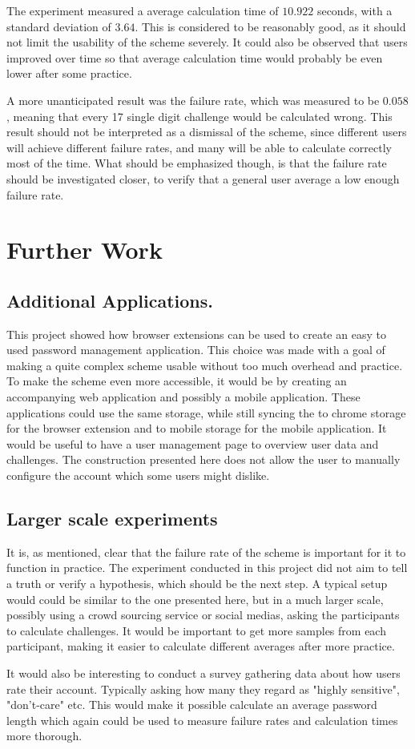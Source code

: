 \par The experiment measured a average calculation time of $10.922$ seconds, with a standard deviation of $3.64$. This is considered to be reasonably good, as it should not limit the usability of the scheme severely. It could also be observed that users improved over time so that average calculation time would probably be even lower after some practice. 
\par A more unanticipated result was the failure rate, which was measured to be $0.058$, meaning that every 17 single digit challenge would be calculated wrong. This result should not be interpreted as a dismissal of the scheme, since different users will achieve different failure rates, and many will be able to calculate correctly most of the time. What should be emphasized though, is that the failure rate should be investigated closer, to verify that a general user average a low enough failure rate. 


\section{Further Work}

\subsection{Additional Applications.}
This project showed how browser extensions can be used to create an easy to used password management application. This choice was made with a goal of making a quite complex scheme usable without too much overhead and practice. To make the scheme even more accessible, it would be by creating an accompanying web application and possibly a mobile application. These applications could use the same storage, while still syncing the to chrome storage for the browser extension and to mobile storage for the mobile application. It would be useful to have a user management page to overview user data and challenges. The construction presented here does not allow the user to manually configure the account which some users might dislike. 

\subsection{Larger scale experiments}
It is, as mentioned, clear that the failure rate of the scheme is important for it to function in practice. The experiment conducted in this project did not aim to tell a truth or verify a hypothesis, which should be the next step. A typical setup would could be similar to the one presented here, but in a much larger scale, possibly using a crowd sourcing service or social medias, asking the participants to calculate challenges. It would be important to get more samples from each participant, making it easier to calculate different averages after more practice.  
\par It would also be interesting to conduct a survey gathering data about how users rate their account. Typically asking how many they regard as "highly sensitive", "don't-care" etc. This would make it possible calculate an average password length which again could be used to measure failure rates and calculation times more thorough. 

